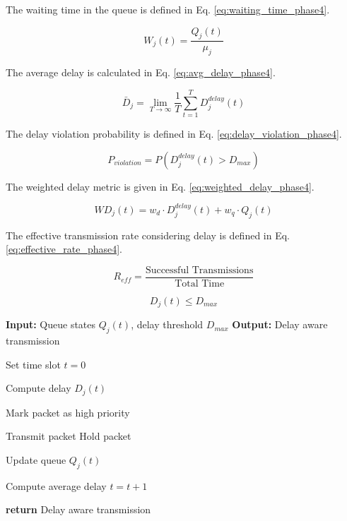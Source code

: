 \documentclass[a4paper,fleqn]{cas-dc}
\numberwithin{equation}{section}
\begin{document}
The waiting time in the queue is defined in Eq. \ref{eq:waiting_time_phase4}.

\begin{equation}
W_j(t) = \frac{Q_j(t)}{\mu_j}
\label{eq:waiting_time_phase4}
\end{equation}

The average delay is calculated in Eq. \ref{eq:avg_delay_phase4}.

\begin{equation}
\bar{D}_j = \lim_{T \to \infty} \frac{1}{T} \sum_{t=1}^{T} D_j^{delay}(t)
\label{eq:avg_delay_phase4}
\end{equation}

The delay violation probability is defined in Eq. \ref{eq:delay_violation_phase4}.

\begin{equation}
P_{violation} = P(D_j^{delay}(t) > D_{max})
\label{eq:delay_violation_phase4}
\end{equation}

The weighted delay metric is given in Eq. \ref{eq:weighted_delay_phase4}.

\begin{equation}
WD_j(t) = w_d \cdot D_j^{delay}(t) + w_q \cdot Q_j(t)
\label{eq:weighted_delay_phase4}
\end{equation}

The effective transmission rate considering delay is defined in Eq. \ref{eq:effective_rate_phase4}.

\begin{equation}
R_{eff} = \frac{\text{Successful Transmissions}}{\text{Total Time}}
\label{eq:effective_rate_phase4}
\end{equation}

\begin{equation}
D_j(t) \leq D_{max}
\end{equation}

\begin{algorithm}
\caption{Phase 4: Delay Aware Transmission}
\begin{algorithmic}

\STATE \textbf{Input:} Queue states $Q_j(t)$, delay threshold $D_{max}$
\STATE \textbf{Output:} Delay aware transmission

\STATE Set time slot $t = 0$


        \STATE Compute delay $D_j(t)$
        
            \STATE Mark packet as high priority
        \ENDIF
        
            \STATE Transmit packet
        \ELSE
            \STATE Hold packet
        \ENDIF
        
        \STATE Update queue $Q_j(t)$
    \ENDFOR

    \STATE Compute average delay
    \STATE $t = t + 1$

\ENDWHILE

\STATE \textbf{return} Delay aware transmission

\end{algorithmic}
\end{algorithm}
\end{document}
